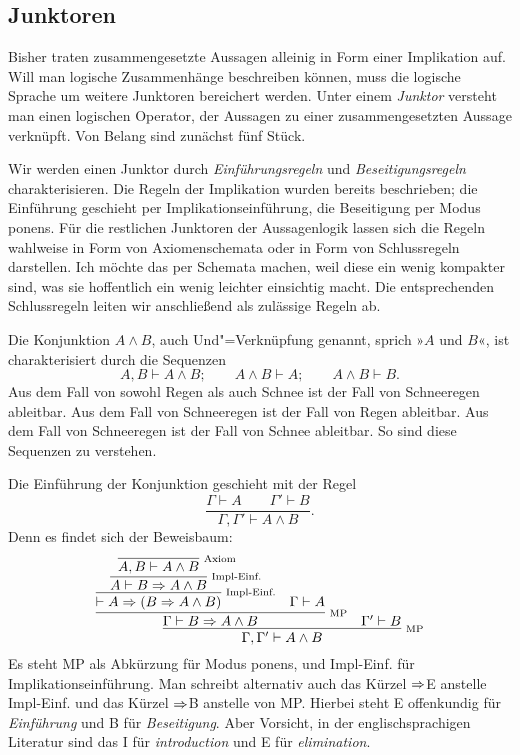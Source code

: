 \subsection{Junktoren}

Bisher traten zusammengesetzte Aussagen alleinig in Form einer
Implikation auf. Will man logische Zusammenhänge beschreiben können,
muss die logische Sprache um weitere Junktoren bereichert werden.
Unter einem \emph{Junktor} versteht man einen logischen
Operator, der Aussagen zu einer zusammengesetzten Aussage verknüpft.
Von Belang sind zunächst fünf Stück.

Wir werden einen Junktor durch \emph{Einführungsregeln}%
 und
\emph{Beseitigungsregeln}
charakterisieren. Die Regeln der Implikation
wurden bereits beschrieben; die Einführung geschieht per
Implikationseinführung, die Beseitigung per Modus ponens.
Für die restlichen Junktoren der Aussagenlogik lassen sich die Regeln
wahlweise in Form von Axiomenschemata oder in Form von Schlussregeln
darstellen. Ich möchte das per Schemata machen, weil diese ein wenig
kompakter sind, was sie hoffentlich ein wenig leichter einsichtig macht.
Die entsprechenden Schlussregeln leiten wir anschließend als zulässige
Regeln ab.

Die Konjunktion $A\land B$, auch Und"=Verknüpfung
genannt, sprich »$A$ und $B$«, ist charakterisiert durch die Sequenzen
\[A,B\vdash A\land B;\qquad A\land B\vdash A;\qquad A\land B\vdash B.\]
Aus dem Fall von sowohl Regen als auch Schnee ist der Fall von
Schneeregen ableitbar. Aus dem Fall von Schneeregen ist der Fall
von Regen ableitbar. Aus dem Fall von Schneeregen ist der Fall
von Schnee ableitbar. So sind diese Sequenzen zu verstehen.

Die Einführung der Konjunktion geschieht mit der Regel
\[\dfrac{\Gamma\vdash A\qquad\Gamma'\vdash B}{\Gamma,\Gamma'\vdash A\land B}.\]
Denn es findet sich der Beweisbaum:
\[
\infer[\infernote{MP}]{\Gamma,\Gamma'\vdash A\land B}{
  \infer[\infernote{MP}]{\Gamma\vdash B\cond A\land B}{
    \infer[\infernote{Impl-Einf.}]{\vdash A\cond (B\cond A\land B)}{
      \infer[\infernote{Impl-Einf.}]{A\vdash B\cond A\land B}{
        \infer[\infernote{Axiom}]{A,B\vdash A\land B}{}}}
  & \Gamma\vdash A}
& \Gamma'\vdash B}
\]
Es steht MP als Abkürzung für Modus ponens, und Impl-Einf. für
Implikationseinführung. Man schreibt alternativ auch das Kürzel
$\Rightarrow$E anstelle Impl-Einf. und das Kürzel $\Rightarrow$B anstelle
von MP. Hierbei steht E offenkundig für \emph{Einführung} und
B für \emph{Beseitigung}. Aber Vorsicht, in der englischsprachigen
Literatur sind das I für \emph{introduction} und E für
\emph{elimination}.

